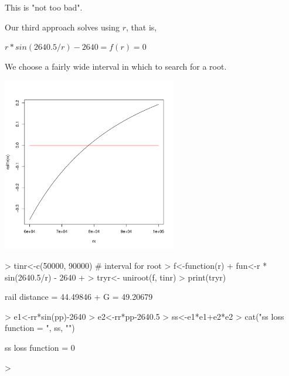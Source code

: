 \documentclass[11pt,letterpaper]{article}
\begin{document}
This is "not too bad". 

Our third approach solves using $r$, that is, 

$ r * sin(2640.5/r) - 2640 = f(r) = 0 $

We choose a fairly wide interval in which to search for a root.

\includegraphics[height=3in]{rail1r.pdf}

\begin{Schunk}
\begin{Sinput}
> tinr<-c(50000, 90000) # interval for root
> f<-function(r) {
+  fun<-r * sin(2640.5/r) - 2640
+ }
> tryr<- uniroot(f, tinr)
> print(tryr)
\end{Sinput}
\begin{Soutput}
rail distance =  44.49846  + G = 49.20679 
\end{Soutput}
\begin{Sinput}
> e1<-rr*sin(pp)-2640
> e2<-rr*pp-2640.5
> ss<-e1*e1+e2*e2
> cat("ss loss function = ", ss, "\n")
\end{Sinput}
\begin{Soutput}
ss loss function =  0 
\end{Soutput}
\begin{Sinput}
> 
\end{Sinput}
\end{Schunk}
\end{document}

